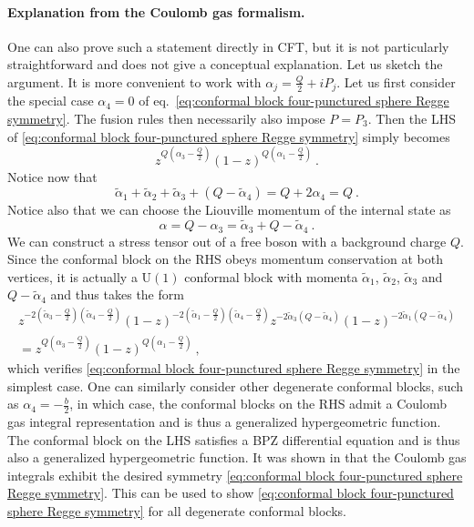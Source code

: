 \documentclass[12pt,a4paper]{article}
\newcommand{\be}{\begin{equation}}
\newcommand{\ee}{\end{equation}}
\begin{document}
\paragraph{Explanation from the Coulomb gas formalism.} One can also prove such a statement directly in CFT, but it is not particularly straightforward and does not give a conceptual explanation. Let us sketch the argument.
It is more convenient to work with $\alpha_j=\frac{Q}{2}+i P_j$. Let us first consider the special case $\alpha_4=0$ of eq.~\eqref{eq:conformal block four-punctured sphere Regge symmetry}. The fusion rules then  necessarily also impose $P=P_3$. Then the LHS of \eqref{eq:conformal block four-punctured sphere Regge symmetry} simply becomes
\be 
z^{Q(\alpha_3-\frac{Q}{2})} (1-z)^{Q(\alpha_1-\frac{Q}{2})}\ .
\ee
Notice now that
\be 
\tilde{\alpha}_1+\tilde{\alpha}_2+\tilde{\alpha}_3+(Q-\tilde{\alpha}_4)=Q+2\alpha_4=Q\ . \label{eq:Coulomb gas background charge saturation}
\ee
Notice also that we can choose the Liouville momentum of the internal state as
\be 
\alpha=Q-\alpha_3=\tilde{\alpha}_3+Q-\tilde{\alpha}_4\ . \label{eq:Coulomb gas momentum conservation}
\ee
We can construct a stress tensor out of a free boson with a background charge $Q$. Since the conformal block on the RHS obeys momentum conservation at both vertices, it is actually a $\mathrm{U}(1)$ conformal block with momenta $\tilde{\alpha}_1$, $\tilde{\alpha}_2$, $\tilde{\alpha}_3$ and $Q-\tilde{\alpha}_4$ and thus takes the form
\begin{multline} 
z^{-2(\tilde{\alpha}_3-\frac{Q}{2})(\tilde{\alpha}_4-\frac{Q}{2})}(1-z)^{-2(\tilde{\alpha}_1-\frac{Q}{2})(\tilde{\alpha}_4-\frac{Q}{2})}z^{-2\tilde{\alpha}_3 (Q-\tilde{\alpha}_4)}(1-z)^{-2\tilde{\alpha}_1 (Q-\tilde{\alpha}_4)} \\
=z^{Q(\alpha_3-\frac{Q}{2})} (1-z)^{Q(\alpha_1-\frac{Q}{2})}\ ,
\end{multline}
which verifies \eqref{eq:conformal block four-punctured sphere Regge symmetry} in the simplest case. One can similarly consider other degenerate conformal blocks, such as $\alpha_4=-\frac{b}{2}$, in which case, the conformal blocks on the RHS admit a Coulomb gas integral representation and is thus a generalized hypergeometric function. The conformal block on the LHS satisfies a BPZ differential equation and is thus also a generalized hypergeometric function. It was shown in \cite{Fateev:2007tt} that the Coulomb gas integrals exhibit the desired symmetry \eqref{eq:conformal block four-punctured sphere Regge symmetry}. This can be used to show \eqref{eq:conformal block four-punctured sphere Regge symmetry} for all degenerate conformal blocks.
\end{document}
